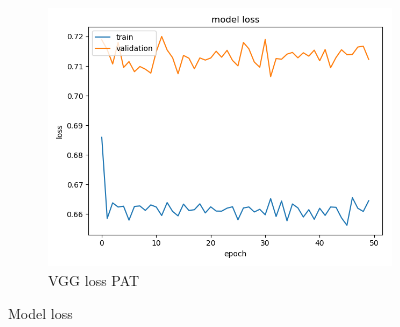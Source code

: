 \begin{figure}[h]
\begin{subfigure}[b]{.3\linewidth}
\includegraphics[width=\linewidth]{Figs/vgg_pat_loss.jpg}
\caption{VGG loss PAT}
\end{subfigure}
\caption{Model loss}
\label{fig:loss}
\end{figure}

